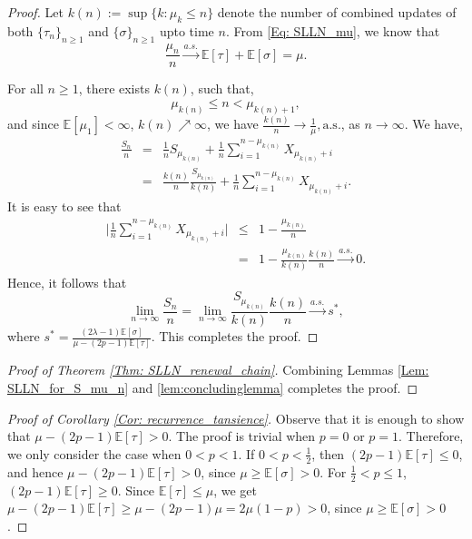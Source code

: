\documentclass{article}
\numberwithin{equation}{section}
\newcommand{\1}{\mathbf{1}}
\newcommand{\0}{\mathbf{0}}
\newcommand{\E}{\mbox{${\mathbb E}$}}
\begin{document}
\begin{proof}
Let $k(n):= \sup \{k : \mu_k \le n\}$ denote the number of combined updates of both $\{\tau_n\}_{n \ge 1}$ and $\{\sigma\}_{n \ge 1}$ upto time $n$.
From \eqref{Eq: SLLN_mu}, we know that 
\begin{equation*}
\frac{\mu_n}{n} \stackrel{a.s.}{\longrightarrow} \E \left[\tau\right]+ \E \left[\sigma\right] =\mu.
\end{equation*}

For all $n \geq 1$, there exists $k(n)$, such that, 
\[ 
\mu_{k(n)} \leq n < \mu_{k(n)+1},
\]
and since $\E \left[\mu_1\right]< \infty$, $k(n) \nearrow \infty$, we have  
$\frac{k(n)}{n} \to \frac{1}{\mu}, \text{a.s.}$, as $n \to \infty$. We have,
\begin{eqnarray*}
\frac{S_n}{n} &=& \frac{1}{n}S_{\mu_{k(n)}} + \frac{1}{n}\sum\limits_{i=1}^{n-\mu_{k(n)}} X_{\mu_{k(n)}+i} \\
&=& \frac{k(n)}{n}\frac{S_{\mu_{k(n)}}}{k(n)}+ \frac{1}{n}\sum\limits_{i=1}^{n-\mu_{k(n)}} X_{\mu_{k(n)}+i}.
\end{eqnarray*}
It is easy to see that
\begin{eqnarray*}
\Big \vert \frac{1}{n}\sum\limits_{i=1}^{n-\mu_{k(n)}} X_{\mu_{k(n)}+i} \Big \vert & \leq & 1- \frac{\mu_{k(n)}}{n} \\
&=& 1-\frac{\mu_{k(n)}}{k(n)}\frac{k(n)}{n} \xrightarrow{a.s.} 0.
\end{eqnarray*}
Hence, it follows that 
\[ 
\lim_{n \to \infty} \frac{S_n}{n} = \lim_{n \to \infty} \frac{S_{\mu_{k(n)}}}{k(n)}\frac{k(n)}{n} \xrightarrow{a.s.} s^*,
\]
where $s^*= \frac{ (2\lambda-1)\E[\sigma]}{\mu - (2p-1)\E[\tau]}.$ This completes the proof.
\end{proof}
\begin{proof}[Proof of Theorem \ref{Thm: SLLN_renewal_chain}]
Combining Lemmas \ref{Lem: SLLN_for_S_mu_n} and \ref{lem:concludinglemma} completes the proof.
\end{proof}
\begin{proof}[Proof of Corollary \ref{Cor: recurrence_tansience}]
Observe that it is enough to show that $\mu - (2p-1)\E[\tau]>0$. The proof is trivial when $p=0$ or $p=1$. Therefore, we only consider the case when $0 <p <1$.  
If $0 < p < \frac{1}{2}$, then $(2p-1)\E[\tau]\le 0$, and hence $\mu - (2p-1)\E[\tau]>0$, since $\mu \ge \E[\sigma]>0$.
For $\frac{1}{2}< p \le 1$, $(2p-1)\E[\tau]\ge 0$.
Since $\E [\tau] \le \mu$, we get 
$\mu - (2p-1)\E[\tau]\ge \mu- (2p-1)\mu =2 \mu(1-p)>0 $, since $\mu \ge \E[\sigma]>0$.

\end{proof}
\end{document}
